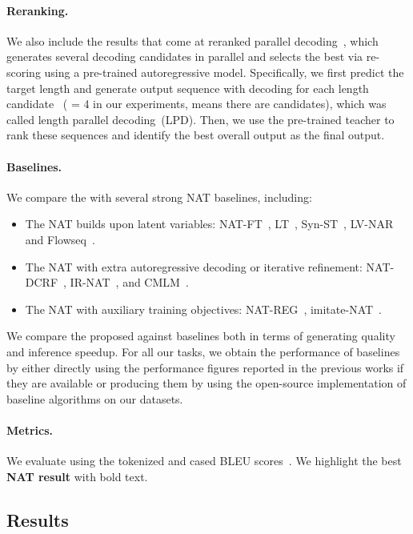 \paragraph{Reranking.}
We also include the results that come at reranked parallel decoding~\citep{nat,enat,nat_reg,imitate_nat}, which generates several decoding candidates in parallel and selects the best via re-scoring using a pre-trained autoregressive model. 
Specifically, we first predict the target length  and generate output sequence with  decoding for each length candidate ~( = 4 in our experiments, means there are  candidates), which was called length parallel decoding~(LPD). 
Then, we use the pre-trained teacher to rank these sequences and identify the best overall output as the final output.

\paragraph{Baselines.}
We compare the \method with several strong NAT baselines, including:
\begin{itemize}
    \item The NAT builds upon latent variables: NAT-FT~\cite{nat}, LT~\cite{lt}, Syn-ST~\cite{syn_st}, LV-NAR~\cite{lv_nar} and Flowseq~\cite{flowseq}.
    \item The NAT with extra autoregressive decoding or iterative refinement: NAT-DCRF~\cite{nat_crf}, IR-NAT~\cite{iter_nat}, and CMLM~\cite{cmlm}.
    \item The NAT with auxiliary training objectives: NAT-REG~\cite{nat_reg}, imitate-NAT~\cite{imitate_nat}.
\end{itemize}
We compare the proposed \method against baselines both in terms of generating quality and inference speedup. 
For all our tasks, we obtain the performance of baselines by either directly using the performance figures reported in the previous works if they are available or producing them by using the open-source implementation of baseline algorithms on our datasets. 

\paragraph{Metrics.}
We evaluate using the tokenized and cased BLEU scores~\citep{bleu}. 
We highlight the best \textbf{NAT result} with bold text.

\subsection{Results}

